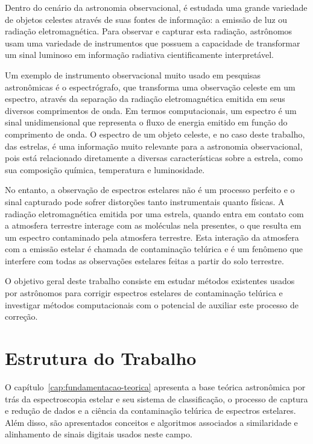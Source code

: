 Dentro do cenário da astronomia observacional, é estudada uma grande variedade de objetos celestes através de suas fontes de informação: a emissão de luz ou radiação eletromagnética. Para observar e capturar esta radiação, astrônomos usam uma variedade de instrumentos que possuem a capacidade de transformar um sinal luminoso em informação radiativa cientificamente interpretável.

Um exemplo de instrumento observacional muito usado em pesquisas astronômicas é o espectrógrafo, que transforma uma observação celeste em um espectro, através da separação da radiação eletromagnética emitida em seus diversos comprimentos de onda. Em termos computacionais, um espectro é um sinal unidimensional que representa o fluxo de energia emitido em função do comprimento de onda. O espectro de um objeto celeste, e no caso deste trabalho, das estrelas, é uma informação muito relevante para a astronomia observacional, pois está relacionado diretamente a diversas características sobre a estrela, como sua composição química, temperatura e luminosidade.

No entanto, a observação de espectros estelares não é um processo perfeito e o sinal capturado pode sofrer distorções tanto instrumentais quanto físicas. A radiação eletromagnética emitida por uma estrela, quando entra em contato com a atmosfera terrestre interage com as moléculas nela presentes, o que resulta em um espectro contaminado pela atmosfera terrestre. Esta interação da atmosfera com a emissão estelar é chamada de contaminação telúrica e é um fenômeno que interfere com todas as observações estelares feitas a partir do solo terrestre.


O objetivo geral deste trabalho consiste em estudar métodos existentes usados por astrônomos para corrigir espectros estelares de contaminação telúrica e investigar métodos computacionais com o potencial de auxiliar este processo de correção.


\section{Estrutura do Trabalho}

O capítulo~\ref{cap:fundamentacao-teorica} apresenta a base teórica astronômica por trás da espectroscopia estelar e seu sistema de classificação, o processo de captura e redução de dados e a ciência da contaminação telúrica de espectros estelares. Além disso, são apresentados conceitos e algoritmos associados a similaridade e alinhamento de sinais digitais usados neste campo.

